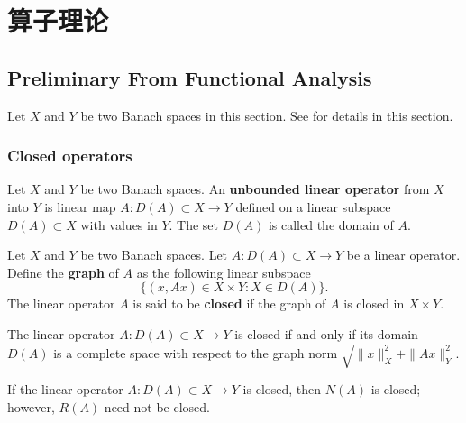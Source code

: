 \chapter{算子理论}



\section{Preliminary From Functional Analysis}


Let $X$ and $Y$ be two Banach spaces in this section. See \cite{Brezis2011, Weidmann1980} for details in this section.

\subsection{Closed operators}
\begin{definition}
Let $X$ and $Y$ be two Banach spaces. An {\bf unbounded linear operator} from
$X$ into $Y$ is linear map $A: D(A)\subset X\to Y$ defined on a linear subspace $D(A)\subset X$ with values in $Y$. The set $D(A)$ is called the domain of $A$.
\end{definition}

\begin{definition}[Graph]
Let $X$ and $Y$ be two Banach spaces. Let $A: D(A)\subset X\to Y$ be a linear operator.
Define the \textbf{graph} of $A$ as the following linear subspace
\[
\{(x, Ax)\in X\times Y: X\in D(A)\}.
\]
The linear operator $A$ is said to be \textbf{closed} if the graph of $A$ is closed in $X\times Y$.
\end{definition}

\begin{lemma}
The linear operator $A: D(A)\subset X\to Y$ is closed if and only if \textcolor[rgb]{1.00,0.00,0.00}{its domain $D(A)$ is a complete space with respect to the graph norm $\sqrt{\|x\|_X^2+\|Ax\|_{Y}^2}$}.
\end{lemma}

\begin{lemma}
If the linear operator $A: D(A)\subset X\to Y$ is closed, then \textcolor[rgb]{1.00,0.00,0.00}{$N(A)$ is closed; however, $R(A)$ need not be closed}.
\end{lemma}

